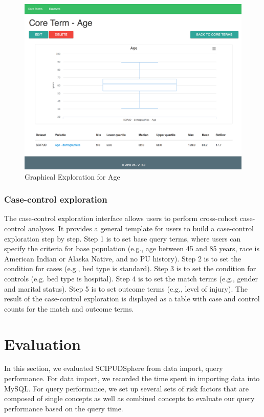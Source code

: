 \documentclass{amia}
\begin{document}
\begin{figure}[h!]
  \centering
  \includegraphics[scale=0.35]{pics/graphical.png}
  \caption{Graphical Exploration for Age}
  \label{graphical}
\end{figure}

\subsubsection{Case-control exploration}
The case-control exploration interface allows users to perform cross-cohort case-control analyses. It provides a general template for users to build a case-control exploration step by step. Step 1 is to set base query terms, where users can specify the criteria for base population (e.g., age between 45 and 85 years, race is American Indian or Alaska Native, and no PU history). Step 2 is to set the condition for cases (e.g., bed type is standard). Step 3 is to set the condition for controls (e.g. bed type is hospital). Step 4 is to set the match terms (e.g., gender and marital status). Step 5 is to set outcome terms (e.g., level of injury). The result of the case-control exploration is displayed as a table with case and control counts for the match and outcome terms.

\section{Evaluation}
In this section, we evaluated SCIPUDSphere from data import, query performance. For data import, we recorded the time spent in importing data into MySQL. For query performance, we set up several sets of risk factors that are composed of single concepts as well as combined concepts to evaluate our query performance based on the query time.
\end{document}
